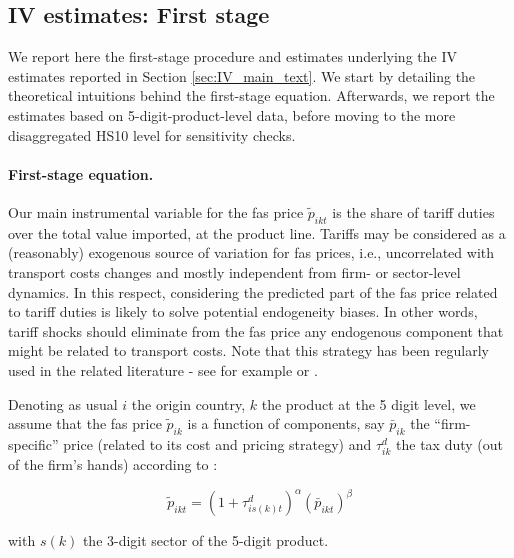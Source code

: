 \documentclass[a4paper,11pt]{article}
\begin{document}
\subsection{IV estimates: First stage \label{app:first_stage_IV}}

We report here the first-stage procedure and estimates underlying the IV estimates reported in Section \ref{sec:IV_main_text}. We start by detailing the theoretical intuitions behind the first-stage equation. Afterwards, we report the estimates based on 5-digit-product-level data, before moving to the more disaggregated HS10 level for sensitivity checks.

\paragraph{First-stage equation.}

Our main instrumental variable for the fas price $\widetilde{p}_{ikt}$ is the share of tariff duties over the total value imported, at the product line. Tariffs may be considered as a (reasonably) exogenous source of variation for fas prices, i.e., uncorrelated with transport costs changes and mostly independent from firm- or sector-level dynamics. In this respect, considering the predicted part of the fas price related to tariff duties is likely to solve potential endogeneity biases. In other words, tariff shocks should eliminate from the fas price any endogenous component that might be related to transport costs. Note that this strategy has been regularly used in the related literature - see for example \citet{Caliendo_Parro_2015} or \citet{Lashkaripour-2017}.

Denoting as usual $i$ the origin country, $k$ the product at the 5 digit level, we assume that the fas price $\widetilde{p}_{ik}$ is a function of components, say $\bar{p}_{ik}$ the ``firm-specific'' price (related to its cost and pricing strategy) and $\tau^d_{ik}$ the tax duty (out of the firm's hands) according to :

\begin{equation}
\widetilde{p}_{ikt} = (1+\tau^d_{is(k)t})^\alpha \left(\bar{p}_{ikt}\right)^\beta \label{eq:link_fas_duty}
\end{equation}

\noindent with $s(k)$ the 3-digit sector of the 5-digit product.
\end{document}

